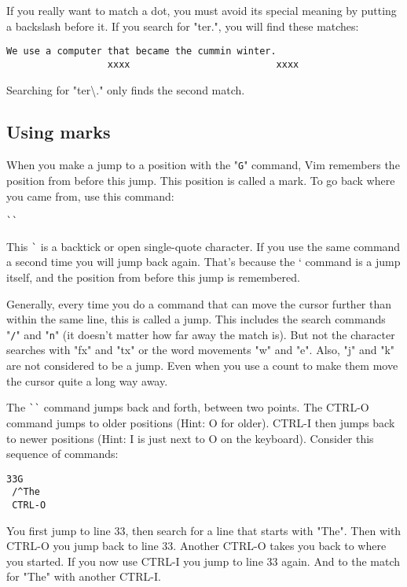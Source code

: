 If you really want to match a dot, you must avoid its special meaning by putting a backslash before it.
If you search for "ter.", you will find these matches:

		\begin{Verbatim}[samepage=true]
    We use a computer that became the cummin winter. 
                  xxxx                          xxxx
		\end{Verbatim}

Searching for "ter\textbackslash ." only finds the second match.

\subsection{Using marks}

When you make a jump to a position with the "\verb!G!" command, Vim remembers the position from before this jump.
This position is called a mark.
To go back where you came from, use this command:

 \begin{Verbatim}[samepage=true]
 ``
 \end{Verbatim}

This \verb!`! is a backtick or open single-quote character.
If you use the same command a second time you will jump back again.
That's because the ` command is a jump itself, and the position from before this jump is remembered.

Generally, every time you do a command that can move the cursor further than within the same line, this is called a jump.
This includes the search commands "\verb!/!" and "\verb!n!" (it doesn't matter how far away the match is).
But not the character searches with "fx" and "tx" or the word movements "w" and "e".
Also, "j" and "k" are not considered to be a jump.
Even when you use a count to make them move the cursor quite a long way away.
 
The \verb!``! command jumps back and forth, between two points.
The CTRL-O command jumps to older positions (Hint: O for older).
CTRL-I then jumps back to newer positions (Hint: I is just next to O on the keyboard).
Consider this sequence of commands:

 \begin{Verbatim}[samepage=true]
 33G
 /^The
 CTRL-O
 \end{Verbatim}

You first jump to line 33, then search for a line that starts with "The".
Then with CTRL-O you jump back to line 33.
Another CTRL-O takes you back to where you started.
If you now use CTRL-I you jump to line 33 again.
And to the match for "The" with another CTRL-I.

